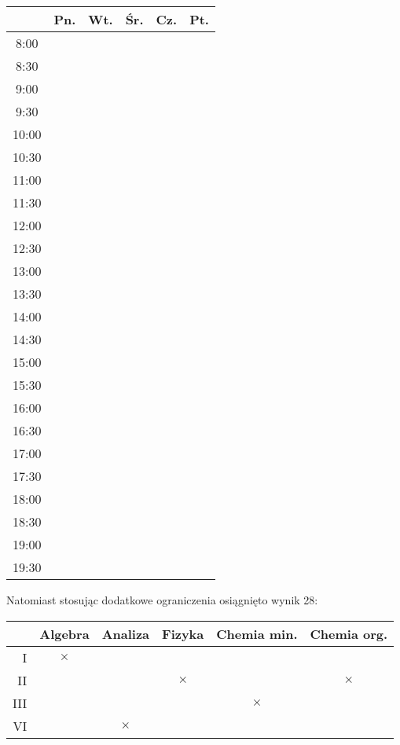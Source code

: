 \documentclass{article}
\begin{document}
\begin{table}[H]
	\centering
	\begin{tabular}{c|c|c|c|c|c}
		& Pn. & Wt. & Śr. & Cz. & Pt.\\\hline
		8:00 & \cellcolor{blue!50} & & & & \\\hline
		8:30 & \cellcolor{blue!50} & & & & \\\hline
		9:00 & \cellcolor{blue!50} & & & & \\\hline
		9:30 & \cellcolor{blue!50} & & & & \\\hline
		10:00 & & \cellcolor{blue!50} & \cellcolor{blue!50} & & \\\hline
		10:30 & \cellcolor{blue!50} & \cellcolor{blue!50} & \cellcolor{blue!50} & & \\\hline
		11:00 & \cellcolor{blue!50} & \cellcolor{blue!50} & \cellcolor{blue!50} & & \\\hline
		11:30 & \cellcolor{blue!50} & \cellcolor{blue!50} & \cellcolor{blue!50} & & \\\hline
		12:00 & & & & & \\\hline
		12:30 & & & & & \\\hline
		13:00 & & & & & \\\hline
		13:30 & & & & & \\\hline
		14:00 & & & & & \\\hline
		14:30 & & & & & \\\hline
		15:00 & & & & & \\\hline
		15:30 & & & & & \\\hline
		16:00 & & & & & \\\hline
		16:30 & & & & & \\\hline
		17:00 & & & & \cellcolor{blue!50} & \\\hline
		17:30 & & & & \cellcolor{blue!50} & \\\hline
		18:00 & & & & \cellcolor{blue!50} & \\\hline
		18:30 & & & & \cellcolor{blue!50} & \\\hline
		19:00 & & & & \cellcolor{blue!50} & \\\hline
		19:30 & & & & \cellcolor{blue!50} & \\\hline
	\end{tabular}
\end{table}

Natomiast stosując dodatkowe ograniczenia osiągnięto wynik 28:

\begin{table}[H]
	\centering
	\begin{tabular}{r|c|c|c|c|c|}
		& Algebra & Analiza & Fizyka & Chemia min. & Chemia org.\\\hline
		I & $\times$ & & & & \\\hline
		II & & & $\times$ & & $\times$ \\\hline
		III & & & & $\times$ & \\\hline
		VI & & $\times$ & & & \\\hline
	\end{tabular}
\end{table}
\end{document}
